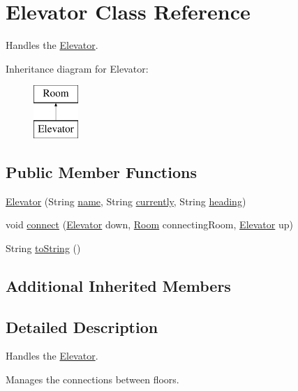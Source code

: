 \hypertarget{classElevator}{}\section{Elevator Class Reference}
\label{classElevator}


Handles the \hyperlink{classElevator}{Elevator}.  


Inheritance diagram for Elevator\+:\begin{figure}[H]
\begin{center}
\leavevmode
\includegraphics[height=2.000000cm]{classElevator}
\end{center}
\end{figure}
\subsection*{Public Member Functions}
\begin{DoxyCompactItemize}
\item 
\hyperlink{classElevator_af8194f56458803bc090fbd6037f6960c}{Elevator} (String \hyperlink{classRoom_a30e9fb0290f64b567572d2f4b4fac4d9}{name}, String \hyperlink{classRoom_a2f0c64fd0d90618f9c36b935a6f6bb49}{currently}, String \hyperlink{classRoom_ad9e86528519166f3ac3b1413da4e0a41}{heading})
\item 
void \hyperlink{classElevator_a394a3717661c03de38f4c94731b69651}{connect} (\hyperlink{classElevator}{Elevator} down, \hyperlink{classRoom}{Room} connecting\+Room, \hyperlink{classElevator}{Elevator} up)
\item 
String \hyperlink{classElevator_a9af8b09a3eea97a57ac227214aa935ee}{to\+String} ()
\end{DoxyCompactItemize}
\subsection*{Additional Inherited Members}


\subsection{Detailed Description}
Handles the \hyperlink{classElevator}{Elevator}. 

Manages the connections between floors. 

